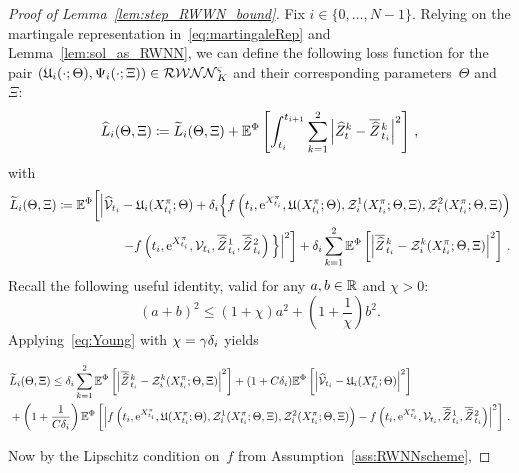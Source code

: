 \begin{proof}[Proof of Lemma~\ref{lem:step_RWWN_bound}]
Fix $i\in\{0,\dots,N-1\}$. Relying on the martingale representation in~\eqref{eq:martingaleRep} and Lemma~\ref{lem:sol_as_RWNN}, we can define the following loss function for the pair $(\mathfrak{U}_i(\cdot; \Theta),\Psi_i(\cdot;\Xi))\in\mathcal{RWNN}^{\varsigma}_K$ and their corresponding parameters~$\Theta$ and~$\Xi$:
    \begin{equation}\label{eq:LHat_LTilde}
        \widehat{L}_i(\Theta,\Xi) \coloneqq  \widetilde{L}_i(\Theta,\Xi) + \mathbb{E}^\Phi\left[\int_{t_i}^{t_{i+1}}\sum_{k=1}^2\left|\widehat Z_t^k - \overline{\widehat{Z}}\kern0.1em^{k}_{t_{i}}\right|^2\right]\,,
    \end{equation}
    with
    \begin{align*}
        \widetilde{L}_i(\Theta,\Xi) \coloneqq  \mathbb{E}^\Phi\bigg[\Big\lvert \widehat {\mathcal{V}}_{t_i} - \mathfrak{U}_i(X^\pi_{t_i}; \Theta) + \delta_{i}  \Big\{ f\left(t_i, \mathrm{e}^{X^\pi_{t_i}}, \mathfrak{U}(X^\pi_{t_i}; \Theta), \mathcal{Z}^1_i(X^\pi_{t_i}; \Theta, \Xi), \mathcal{Z}^2_i(X^\pi_{t_i}; \Theta, \Xi)\right) \\ - f\left(t_i, \mathrm{e}^{X^\pi_{t_i}}, \mathcal{V}_{t_i}, \overline{\widehat{Z}}\kern0.1em^{1}_{t_{i}}, \overline{\widehat{Z}}\kern0.1em^{2}_{t_{i}}\right) \Big\} \Big\rvert^2\bigg] + \delta_{i} \sum_{k=1}^2\mathbb{E}^\Phi\left[ \left\lvert \overline{\widehat{Z}}\kern0.1em^{k}_{t_{i}} - \mathcal{Z}_i^k(X^\pi_{t_i}; \Theta, \Xi)\right\rvert^2\right]\,.
    \end{align*}
    Recall the following useful identity, valid for any
    $a, b\in\mathbb{R}$ and $\chi>0$:
    \begin{equation}\label{eq:Young}
    {(a+b)^2 \leq \left(1+\chi\right)a^2 + \left(1+\frac{1}{\chi}\right)b^2}.
    \end{equation}
    Applying~\eqref{eq:Young} with $\chi = \gamma\delta_{i}$ yields
    \begin{small}
    \begin{align*}
        & \widetilde{L}_i(\Theta, \Xi) \leq \delta_{i} \sum_{k=1}^2\mathbb{E}^\Phi\left[ \left\lvert \overline{\widehat{Z}}\kern0.1em^{k}_{t_{i}} - \mathcal{Z}_i^k(X^\pi_{t_i}; \Theta, \Xi)\right\rvert^2\right] + (1 + C\delta_{i} ) \mathbb{E}^\Phi\left[\left\lvert \widehat {\mathcal{V}}_{t_i} - \mathfrak{U}_i(X^\pi_{t_i}; \Theta)\right\rvert^2\right] \\ 
        & + \left(1+\frac1{C\delta_{i} }\right)\mathbb{E}^\Phi\left[\left\lvert  f\left(t_i, \mathrm{e}^{X^\pi_{t_i}}, \mathfrak{U}(X^\pi_{t_i}; \Theta), \mathcal{Z}^1_i(X^\pi_{t_i}; \Theta, \Xi), \mathcal{Z}^2_i(X^\pi_{t_i}; \Theta, \Xi)\right) - f\left(t_i, \mathrm{e}^{X^\pi_{t_i}}, \mathcal{V}_{t_i}, \overline{\widehat{Z}}\kern0.1em^{1}_{t_{i}}, \overline{\widehat{Z}}\kern0.1em^{2}_{t_{i}}\right) \right\rvert^2\right]\,.
    \end{align*}
    \end{small}%
    Now by the Lipschitz condition on~$f$ from Assumption~\ref{ass:RWNNscheme},

\end{proof}
